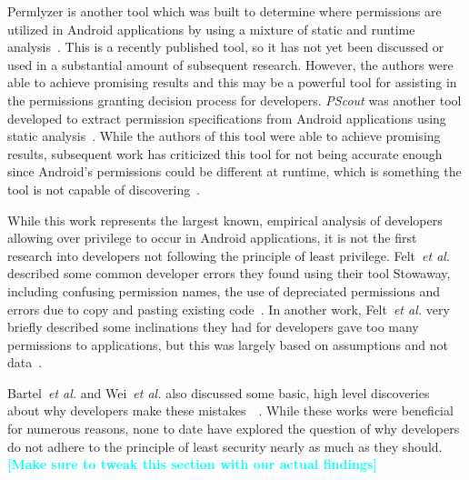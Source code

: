 \documentclass{sig-alternate}
\newcommand{\todo}[1]{\textcolor{cyan}{\textbf{[#1]}}}
\begin{document}
Permlyzer is another tool which was built to determine where permissions are utilized in Android applications by using a mixture of static and runtime analysis~\cite{6698893}. This is a recently published tool, so it has not yet been discussed or used in a substantial amount of subsequent research. However, the authors were able to achieve promising results and this may be a powerful tool for assisting in the permissions granting decision process for developers. \emph{PScout} was another tool developed to extract permission specifications from Android applications using static analysis~\cite{Au:2012:PAA:2382196.2382222}. While the authors of this tool were able to achieve promising results, subsequent work has criticized this tool for not being accurate enough since Android's permissions could be different at runtime, which is something the tool is not capable of discovering~\cite{zhang2013vetting}.

While this work represents the largest known, empirical analysis of developers allowing over privilege to occur in Android applications, it is not the first research into developers not following the principle of least privilege. Felt~\emph{et al.} described some common developer errors they found using their tool Stowaway, including confusing permission names, the use of depreciated permissions and errors due to copy and pasting existing code~\cite{Felt:2011:APD:2046707.2046779}. In another work,  Felt~\emph{et al.} very briefly described some inclinations they had for developers gave too many permissions to applications, but this was largely based on assumptions and not data~\cite{Felt:2011:EAP:2002168.2002175}.


Bartel~\emph{et al.} and Wei~\emph{et al.} also discussed some basic, high level discoveries about why developers make these mistakes~\cite{Bartel:2012:ASP:2351676.2351722}~\cite{Wei:2012:PEA:2420950.2420956}. While these works were beneficial for numerous reasons, none to date have explored the question of why developers do not adhere to the principle of least security nearly as much as they should.
\todo{Make sure to tweak this section with our actual findings}





\end{document}
